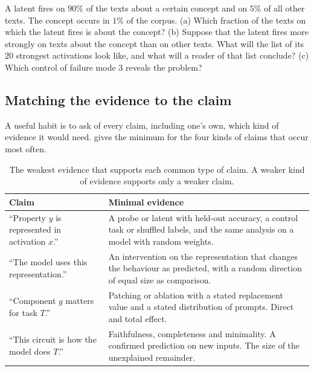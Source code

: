 \begin{exercise}\label{ex:baserate}
A latent fires on $90\%$ of the texts about a certain concept and on $5\%$ of all other texts. The concept occurs
in $1\%$ of the corpus. (a) Which fraction of the texts on which the latent fires is about the concept?
(b) Suppose that the latent fires more strongly on texts about the concept than on other texts. What will the
list of its $20$ strongest activations look like, and what will a reader of that list conclude? (c) Which control
of failure mode 3 reveals the problem?
\end{exercise}

\subsection{Matching the evidence to the claim}

A useful habit is to ask of every claim, including one's own, which kind of evidence it would need.
 gives the minimum for the four kinds of claims that occur most often.

\begin{table}[t]
\centering\small
\begin{tabular}{@{}p{}p{}@{}}
\toprule
Claim & Minimal evidence \\
\midrule
``Property $y$ is represented in activation $x$.'' & A probe or latent with held-out accuracy, a control task or
shuffled labels, and the same analysis on a model with random weights. \\ \addlinespace
``The model uses this representation.'' & An intervention on the representation that changes the behaviour as
predicted, with a random direction of equal size as comparison. \\ \addlinespace
``Component $g$ matters for task $T$.'' & Patching or ablation with a stated replacement value and a stated
distribution of prompts. Direct and total effect. \\ \addlinespace
``This circuit is how the model does $T$.'' & Faithfulness, completeness and minimality. A confirmed prediction
on new inputs. The size of the unexplained remainder. \\
\bottomrule
\end{tabular}
\caption{The weakest evidence that supports each common type of claim. A weaker kind of evidence supports only
a weaker claim.}
\label{tab:evidence}
\end{table}

